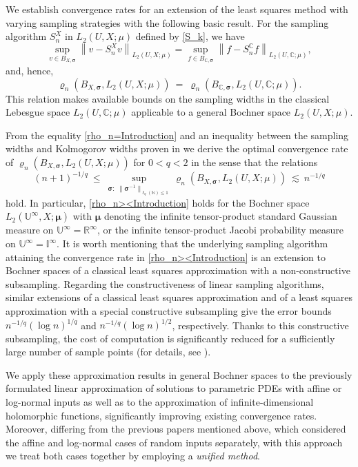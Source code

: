 \documentclass[11pt]{article}
\numberwithin{equation}{section}
\theoremstyle{definition}
\theoremstyle{remark}
\newcommand{\norm}[2]{\left\|{#1}\right\|_{#2}}
\newcommand{\bsigma}{{\boldsymbol{\sigma}}}
\newcommand{\bmu}{{\boldsymbol{\mu}}}
\def\NN{{\mathbb N}}
\def\CC{{\mathbb C}}
\def\CC{{\mathbb C}}
\def\NN{{\mathbb N}}
\def\IIi{{\mathbb I}^\infty}
\def\RRi{{\mathbb R}^\infty}
\def\UUi{{\mathbb U}^{\infty}}
\def\CC{{\mathbb C}}
\def\NN{{\mathbb N}}
\begin{document}
We establish convergence rates for an extension of the least squares method with varying sampling strategies with the following basic result.
For the sampling algorithm $S_n^X$ in $L_2(U,X;\mu)$ defined by \eqref{S_k}, we have
\begin{equation*} \label{sampling-equality}
	\sup_{v \in B_{X,\bsigma}} \norm{v- S_n^X v}{L_2(U,X;\mu)}
	= \sup_{f \in B_{\CC,\bsigma}} \norm{f - S_n^\CC f}{L_2(U,\CC;\mu)},
\end{equation*}
and, hence,
\begin{equation} \label{rho_n=Introduction}
    \varrho_n(B_{X,\bsigma}, L_2(U,X;\mu)) \ = \ \varrho_n(B_{\CC,\bsigma}, L_2(U,\CC;\mu)).
\end{equation}
This relation makes available bounds on the sampling widths in the classical Lebesgue space $L_2(U,\CC;\mu)$ applicable to a general Bochner space $L_2(U,X;\mu)$.

From the equality \eqref{rho_n=Introduction} and an inequality between the sampling widths and Kolmogorov widths proven in \cite[Theorem 1]{DKU2023} we derive the  optimal convergence rate of $\varrho_n(B_{X,\bsigma}, L_2(U,X;\mu))$ for $0< q<2$ in the sense that
the relations 
{
	\begin{equation} \label{rho_n><Introduction}
        (n+1)^{-1/q}
\ \le \
\sup_{{\bsigma}: \ \|\bsigma^{-1}\|_{\ell_q(\NN) \le 1}}	\varrho_n(B_{X,\bsigma}, L_2(U,X;\mu)) 
        \ \lesssim \ n^{-1/q}
\end{equation}
hold. In particular, \eqref{rho_n><Introduction} holds for the  Bochner space $L_2(\UUi,X;\bmu)$ with $\bmu$ denoting the infinite tensor-product standard Gaussian measure on  $\UUi=\RRi$, or the infinite tensor-product Jacobi probability measure on $\UUi=\IIi$.}
It is worth mentioning that the underlying sampling algorithm attaining the convergence rate in \eqref{rho_n><Introduction} is an extension to Bochner spaces of a classical least squares approximation with a non-constructive subsampling.
Regarding the constructiveness of linear sampling algorithms, similar extensions of a classical least squares approximation and of a least squares approximation with a special constructive subsampling give the error bounds $n^{-1/q}(\log n)^{1/q}$ and $ n^{-1/q}(\log n)^{1/2}$, respectively.
Thanks to this constructive subsampling, the cost of computation is significantly reduced for a sufficiently large number of sample points (for details, see \cite{BSU23}).

We apply these approximation results in general Bochner spaces to the previously formulated linear approximation of solutions to parametric PDEs with affine or log-normal inputs as well as to the approximation of infinite-dimensional holomorphic functions, significantly improving existing convergence rates.
Moreover, differing from the previous papers mentioned above, which considered the affine and log-normal cases of random inputs separately, with this approach we treat both cases together by employing a \emph{unified method}.
\end{document}
